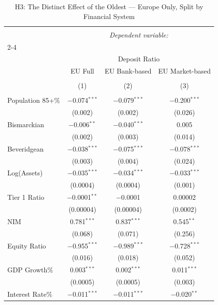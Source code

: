 
\begin{table}[!htbp] \centering 
  \caption{H3: The Distinct Effect of the Oldest --- Europe Only, Split by Financial System} 
  \label{} 
\begin{tabular}{@{\extracolsep{5pt}}lccc} 
\\[-1.8ex]\hline 
\hline \\[-1.8ex] 
 & \multicolumn{3}{c}{\textit{Dependent variable:}} \\ 
\cline{2-4} 
\\[-1.8ex] & \multicolumn{3}{c}{Deposit Ratio} \\ 
 & EU Full & EU Bank-based & EU Market-based \\ 
\\[-1.8ex] & (1) & (2) & (3)\\ 
\hline \\[-1.8ex] 
 Population 85+\% & $-$0.074$^{***}$ & $-$0.079$^{***}$ & $-$0.200$^{***}$ \\ 
  & (0.002) & (0.002) & (0.026) \\ 
  Bismarckian & $-$0.006$^{**}$ & $-$0.040$^{***}$ & 0.005 \\ 
  & (0.002) & (0.003) & (0.014) \\ 
  Beveridgean & $-$0.038$^{***}$ & $-$0.075$^{***}$ & $-$0.078$^{***}$ \\ 
  & (0.003) & (0.004) & (0.024) \\ 
  Log(Assets) & $-$0.035$^{***}$ & $-$0.034$^{***}$ & $-$0.033$^{***}$ \\ 
  & (0.0004) & (0.0004) & (0.001) \\ 
  Tier 1 Ratio & $-$0.0001$^{**}$ & $-$0.0001 & 0.00002 \\ 
  & (0.00004) & (0.00004) & (0.0002) \\ 
  NIM & 0.781$^{***}$ & 0.837$^{***}$ & 0.545$^{**}$ \\ 
  & (0.068) & (0.071) & (0.256) \\ 
  Equity Ratio & $-$0.955$^{***}$ & $-$0.989$^{***}$ & $-$0.728$^{***}$ \\ 
  & (0.016) & (0.018) & (0.052) \\ 
  GDP Growth\% & 0.003$^{***}$ & 0.002$^{***}$ & 0.011$^{***}$ \\ 
  & (0.0005) & (0.0005) & (0.003) \\ 
  Interest Rate\% & $-$0.011$^{***}$ & $-$0.011$^{***}$ & $-$0.020$^{**}$ \\ 

\end{tabular}
\end{table}

